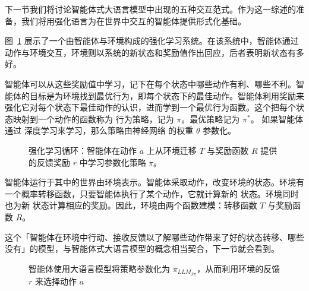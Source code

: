 下一节我们将讨论智能体式大语言模型中出现的五种交互范式。作为这一综述的准备，我们将用强化语言为在世界中交互的智能体提供形式化基础。

图~\ref{fig:rl} 展示了一个由智能体与环境构成的强化学习系统。在该系统中，智能体通过动作与环境交互，环境则以系统的新状态和奖励值作出回应，后者表明新状态有多好。

智能体可以从这些奖励值中学习，记下在每个状态中哪些动作有利、哪些不利。智能体的目标是为环境找到最优行为，即每个状态下的最佳动作。智能体利用奖励来强化它对每个状态下最佳动作的认识，进而学到一个最优行为函数。这个把每个状态映射到一个动作的函数称为
行为策略，记为 $\pi$。最优策略记为
$\pi^*$。 
如果智能体通过
深度学习来学习，那么策略由神经网络
的权重 $\theta$ 参数化。

\begin{figure}
  \begin{center}
    
    \caption{强化学习循环：智能体在动作 $a$ 上从环境迁移 $T$ 与奖励函数 $R$ 提供的反馈奖励 $r$ 中学习参数化策略 $\pi_\theta$ \citep{sutton2018reinforcement}}\label{fig:rl}
  \end{center}
\end{figure}

智能体运行于其中的世界由环境表示。智能体采取动作，改变环境的状态。环境有一个概率转移函数，只要智能体执行了某个动作，它就计算新的
状态。环境同时也为新
状态计算相应的奖励。因此，环境由两个函数建模：转移函数 $T$ 与奖励函数 $R$。%

这个「智能体在环境中行动、接收反馈以了解哪些动作带来了好的状态转移、哪些没有」的模型，与智能体式大语言模型的概念相当契合，下一节就会看到。


\begin{figure}
  \begin{center}
    
    \caption{智能体使用大语言模型将策略参数化为 $\pi_{LLM_{P\pi}}$，从而利用环境的反馈 $r$ 来选择动作 $a$ }\label{fig:rl-llm}
  \end{center}
\end{figure}

